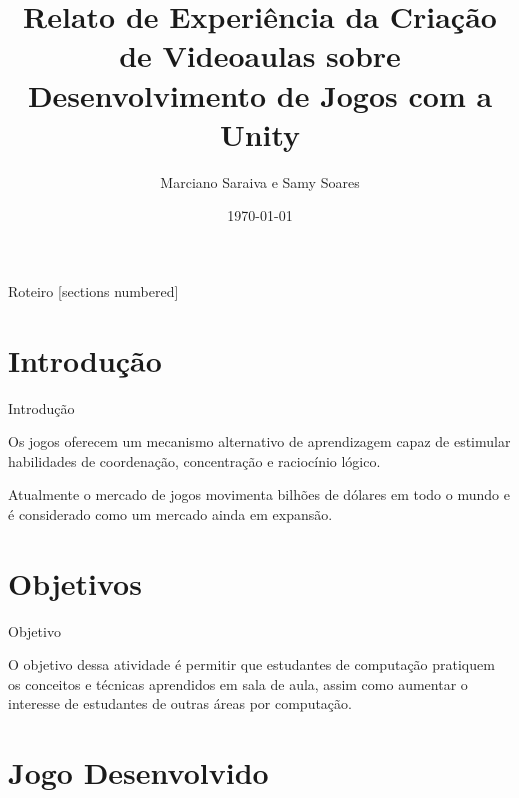 \documentclass[10pt]{beamer}
\title{Relato de Experiência da Criação de Videoaulas sobre Desenvolvimento de Jogos com a Unity}
\date{\today}
\author{Marciano Saraiva e Samy Soares}
\institute{Universidade Federal do Cear\'a - Campus de Quixad\'a}
\begin{document}
\maketitle

\begin{frame}{Roteiro}
	[sections numbered]
	\tableofcontents[hideallsubsections]
\end{frame}

\section{Introdu\c{c}\~ao}

\begin{frame}{Introdução}

Os jogos oferecem um mecanismo alternativo de aprendizagem capaz de estimular habilidades de coordenação,
concentração e raciocínio lógico.

Atualmente o mercado de jogos movimenta bilhões de dólares em todo o mundo e é considerado como um mercado ainda em expansão.

\end{frame}


\section{Objetivos}

\begin{frame}{Objetivo}

O objetivo dessa atividade é permitir que estudantes de computação pratiquem os conceitos e técnicas aprendidos em sala de aula, assim como aumentar o interesse de
estudantes de outras áreas por computação.

\end{frame}

\section{Jogo Desenvolvido}
\end{document}
